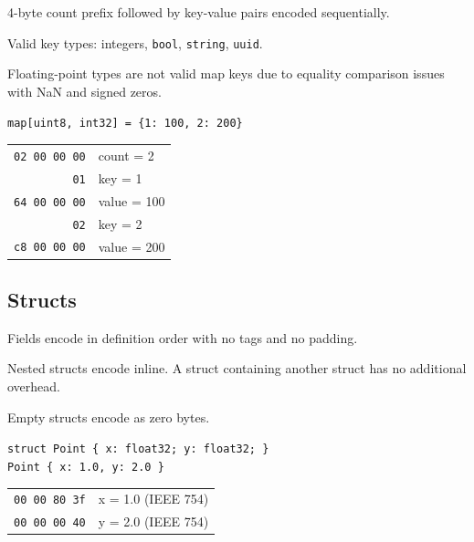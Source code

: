 \documentclass[11pt,onecolumn]{article}
\begin{document}
\begin{minipage}[t]{0.48\textwidth}
\raggedright
4-byte count prefix followed by key-value pairs encoded sequentially.

\vspace{6pt}
Valid key types: integers, \texttt{bool}, \texttt{string}, \texttt{uuid}.

\vspace{6pt}
Floating-point types are not valid map keys due to equality comparison issues with NaN and signed zeros.
\end{minipage}\hfill
\begin{minipage}[t]{0.48\textwidth}
\small
\texttt{map[uint8, int32] = \{1: 100, 2: 200\}}
\vspace{4pt}

\begin{tabular}[t]{@{}r@{\quad}l@{}}
\texttt{02 00 00 00} & count = 2 \\
\texttt{01} & key = 1 \\
\texttt{64 00 00 00} & value = 100 \\
\texttt{02} & key = 2 \\
\texttt{c8 00 00 00} & value = 200 \\
\end{tabular}
\end{minipage}


\subsection{Structs}
\label{sec:wire-structs}

\begin{minipage}[t]{0.48\textwidth}
Fields encode in definition order with no tags and no padding.

\vspace{6pt}
Nested structs encode inline. A struct containing another struct has no additional overhead.

\vspace{6pt}
Empty structs encode as zero bytes.
\end{minipage}\hfill
\begin{minipage}[t]{0.48\textwidth}
\small\raggedright
\texttt{struct Point \{ x: float32; y: float32; \}}\\
\texttt{Point \{ x: 1.0, y: 2.0 \}}
\vspace{4pt}

\begin{tabular}[t]{@{}r@{\quad}l@{}}
\texttt{00 00 80 3f} & x = 1.0 (IEEE 754) \\
\texttt{00 00 00 40} & y = 2.0 (IEEE 754) \\
\end{tabular}
\end{minipage}
\end{document}
